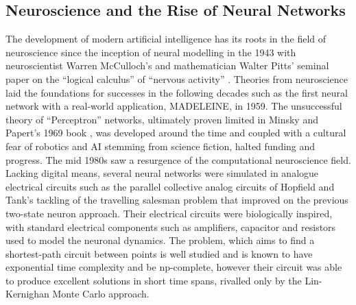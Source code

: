 \documentclass[11pt, twocolumn]{article}
\begin{document}
\subsection*{Neuroscience and the Rise of Neural Networks}
The development of modern artificial intelligence has its roots in the field of neuroscience since the inception of neural modelling in the 1943 with neuroscientist Warren McCulloch's and mathematician Walter Pitts' seminal paper on the ``logical calculus'' of ``nervous activity'' \cite{mcculloch1943logical}. Theories from neuroscience laid the foundations for successes in the following decades such as the first neural network with a real-world application, \acs{MADELEINE}, in 1959. The unsuccessful theory of ``Perceptron'' networks, ultimately proven limited in Minsky and Papert's 1969 book \cite{minsky1969perceptron}, was developed around the time and coupled with a cultural fear of robotics and AI stemming from science fiction, halted funding and progress. The mid 1980s saw a resurgence of the computational neuroscience field. Lacking digital means, several neural networks were simulated in analogue electrical circuits such as the parallel collective analog circuits of Hopfield and Tank's tackling of the travelling salesman problem \cite{hopfield1985neural} that improved on the previous two-state neuron approach. Their electrical circuits were biologically inspired, with standard electrical components such as amplifiers, capacitor and resistors used to model the neuronal dynamics. The problem, which aims to find a shortest-path circuit between points is well studied and is known to have exponential time complexity and be np-complete, however their circuit was able to produce excellent solutions in short time spans, rivalled only by the Lin-Kernighan Monte Carlo approach.
\end{document}
